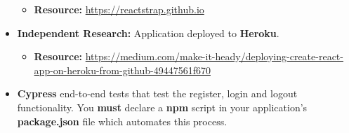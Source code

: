 \documentclass{article}
\begin{document}
\begin{itemize}
        \begin{itemize}
            \item \textbf{Resource:} \small\href{https://reactstrap.github.io}{https://reactstrap.github.io}
        \end{itemize}
        \item \textbf{Independent Research:} Application deployed to \textbf{Heroku}. 
        \begin{itemize}
            \item \textbf{Resource:} \small\href{https://medium.com/make-it-heady/deploying-create-react-app-on-heroku-from-github-49447561f670}{https://medium.com/make-it-heady/deploying-create-react-app-on-heroku-from-github-49447561f670}
        \end{itemize}
        \item \textbf{Cypress} end-to-end tests that test the register, login and logout functionality. You \textbf{must} declare a \textbf{npm} script in your application's \textbf{package.json} file which automates this process.
\end{itemize}
\end{document}
